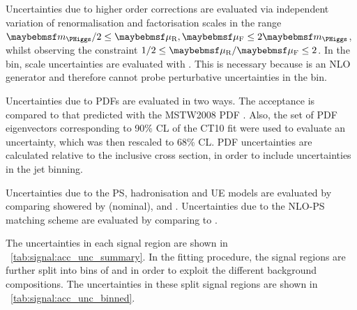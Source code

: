 Uncertainties due to higher order corrections are evaluated via independent variation of 
renormalisation and factorisation scales in the range $\mH/2 \leq \mur,\muf \leq 2\mH$, 
whilst observing the constraint $1/2 \leq \mur/\muf \leq 2$. In the \twojet bin, scale 
uncertainties are evaluated  with \mcfm 
\cite{MCFM:H2j}. This is necessary because \powhegbox is an NLO generator and therefore 
cannot probe perturbative uncertainties in the \twojet bin.

Uncertainties due to \acp{PDF} are evaluated in two ways. The acceptance is compared to 
that predicted with the MSTW2008 PDF \cite{MSTW}. Also, the set of PDF eigenvectors 
corresponding to 90\% \ac{CL} of the CT10 fit were used to evaluate an uncertainty, 
which was then rescaled to 68\% \ac{CL}. PDF uncertainties are calculated relative to the 
inclusive cross section, in order to include uncertainties in the jet binning.

Uncertainties due to the \ac{PS}, hadronisation and \ac{UE} models are evaluated by 
comparing \powhegbox showered by  (nominal),  and \fherwig. 
Uncertainties due to the NLO-PS matching scheme are evaluated by comparing 
\meps{\powhegbox}{\fherwig} to \meps{\mcatnlo}{\herwigpp}.

The uncertainties in each signal region are shown in 
\Table~\ref{tab:signal:acc_unc_summary}. In the fitting procedure, the signal regions are 
further split into bins of \ptsubleadlep and \mll in order to exploit the different 
background compositions. The uncertainties in these split signal regions are shown in 
\Table~\ref{tab:signal:acc_unc_binned}.

